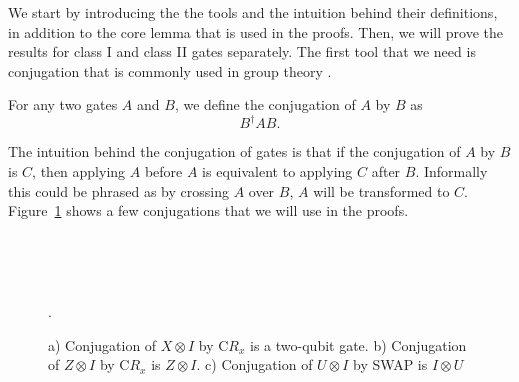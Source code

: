 We start by introducing the the tools and the intuition behind their definitions, in addition to the core lemma that is used in the proofs. Then, we will prove the results for class I and class II gates separately. The first tool that we need is conjugation that is commonly used in group theory \cite{weisstein}.

\begin{definition}[Conjugation]
  For any two gates $A$ and $B$, we define the conjugation of $A$ by $B$ as
  \begin{equation}
    B^\dagger A B.
  \end{equation}
\end{definition}

The intuition behind the conjugation of gates is that if the conjugation of $A$ by $B$ is $C$, then applying $A$ before $A$ is equivalent to applying $C$ after $B$. Informally this could be phrased as by crossing $A$ over $B$, $A$ will be transformed to $C$. Figure~\ref{fig:conjugations} shows a few conjugations that we will use in the proofs.

\begin{figure}[ht]\label{fig:conjugations}
  \centering
   \\
   \\
  \caption{a) Conjugation of $X \otimes I$ by $\mathrm{C}R_x$ is a two-qubit gate. b) Conjugation of $Z \otimes I$ by $\mathrm{C}R_x$ is $Z \otimes I$. c) Conjugation of $U \otimes I$ by SWAP is $I \otimes U$}.
\end{figure}

